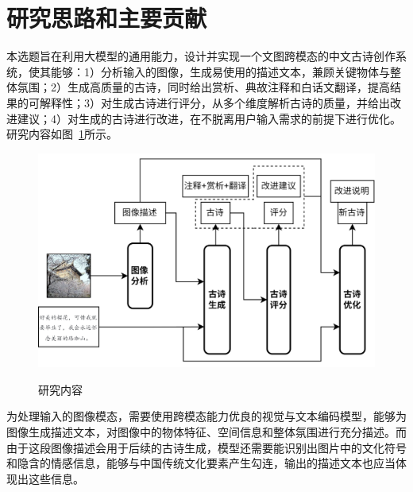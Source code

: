 \section{研究思路和主要贡献}


本选题旨在利用大模型的通用能力，设计并实现一个文图跨模态的中文古诗创作系统，使其能够：1）分析输入的图像，生成易使用的描述文本，兼顾关键物体与整体氛围；2）生成高质量的古诗，同时给出赏析、典故注释和白话文翻译，提高结果的可解释性；3）对生成古诗进行评分，从多个维度解析古诗的质量，并给出改进建议；4）对生成的古诗进行改进，在不脱离用户输入需求的前提下进行优化。研究内容如图~\ref{fig:研究内容}所示。


\begin{figure}[ht]
  \centering
  \includegraphics[width=1\textwidth]
  {figures/研究内容.jpg}\\
  \caption{研究内容}
  \label{fig:研究内容} %
\end{figure}

为处理输入的图像模态，需要使用跨模态能力优良的视觉与文本编码模型，能够为图像生成描述文本，对图像中的物体特征、空间信息和整体氛围进行充分描述。而由于这段图像描述会用于后续的古诗生成，模型还需要能识别出图片中的文化符号和隐含的情感信息，能够与中国传统文化要素产生勾连，输出的描述文本也应当体现出这些信息。

